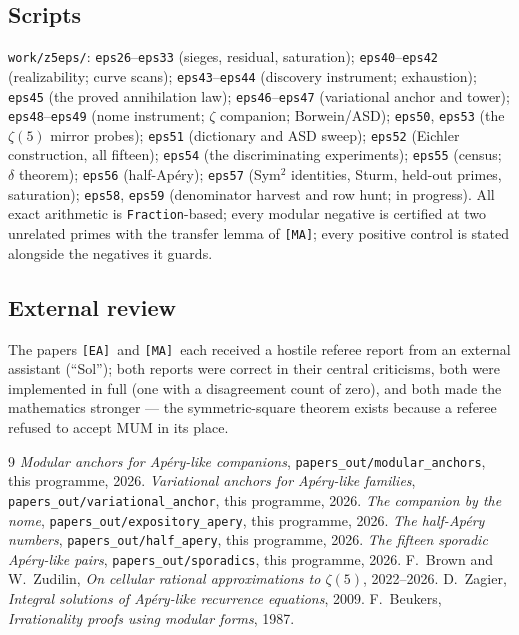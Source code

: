 \documentclass[11pt,reqno]{amsart}
\theoremstyle{plain}
\theoremstyle{definition}
\theoremstyle{remark}
\newcommand{\MA}{\texttt{[MA]}}
\newcommand{\EA}{\texttt{[EA]}}
\begin{document}
\subsection*{Scripts} \texttt{work/z5eps/}: \texttt{eps26}--\texttt{eps33}
(sieges, residual, saturation); \texttt{eps40}--\texttt{eps42}
(realizability; curve scans); \texttt{eps43}--\texttt{eps44} (discovery
instrument; exhaustion); \texttt{eps45} (the proved annihilation law);
\texttt{eps46}--\texttt{eps47} (variational anchor and tower);
\texttt{eps48}--\texttt{eps49} (nome instrument; $\zeta$ companion;
Borwein/ASD); \texttt{eps50}, \texttt{eps53} (the $\zeta(5)$ mirror
probes); \texttt{eps51} (dictionary and ASD sweep); \texttt{eps52}
(Eichler construction, all fifteen); \texttt{eps54} (the discriminating
experiments); \texttt{eps55} (census; $\delta$ theorem);
\texttt{eps56} (half-Ap\'ery); \texttt{eps57} (Sym$^2$ identities,
Sturm, held-out primes, saturation); \texttt{eps58}, \texttt{eps59}
(denominator harvest and row hunt; in progress). All exact arithmetic is
\texttt{Fraction}-based; every modular negative is certified at two
unrelated primes with the transfer lemma of \MA; every positive control
is stated alongside the negatives it guards.

\subsection*{External review} The papers \EA\ and \MA\ each received a
hostile referee report from an external assistant (``Sol''); both reports
were correct in their central criticisms, both were implemented in full
(one with a disagreement count of zero), and both made the mathematics
stronger --- the symmetric-square theorem exists because a referee
refused to accept MUM in its place.

\begin{thebibliography}{9}
 \emph{Modular anchors for Ap\'ery-like companions},
\texttt{papers\_out/modular\_anchors}, this programme, 2026.
 \emph{Variational anchors for Ap\'ery-like families},
\texttt{papers\_out/variational\_anchor}, this programme, 2026.
 \emph{The companion by the nome},
\texttt{papers\_out/expository\_apery}, this programme, 2026.
 \emph{The half-Ap\'ery numbers},
\texttt{papers\_out/half\_apery}, this programme, 2026.
 \emph{The fifteen sporadic Ap\'ery-like pairs},
\texttt{papers\_out/sporadics}, this programme, 2026.
 F.~Brown and W.~Zudilin, \emph{On cellular rational
approximations to $\zeta(5)$}, 2022--2026.
 D.~Zagier, \emph{Integral solutions of Ap\'ery-like
recurrence equations}, 2009.
 F.~Beukers, \emph{Irrationality proofs using modular
forms}, 1987.
\end{thebibliography}
\end{document}
